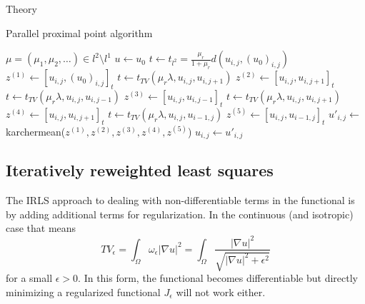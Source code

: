 \begin{chapter}{Theory}
\begin{algorithm}
\caption{Parallel proximal point algorithm}
\label{al:parallel_prpt}
\begin{algorithmic}
\REQUIRE $\mu =(\mu_1,\mu_2, \ldots)\in l^2\setminus l^1$
\STATE $u \leftarrow u_0$
\STATE $t \leftarrow t_{l^{2}}=\frac{\mu_r}{1+\mu_r}d(u_{i,j},(u_0)_{i,j})$
\STATE $z^{(1)} \leftarrow [u_{i,j},(u_0)_{i,j}]_t$
\STATE $t \leftarrow  t_{TV}(\mu_r\lambda,u_{i,j},u_{i,j+1})$
\STATE $z^{(2)} \leftarrow [u_{i,j},u_{i,j+1}]_t$
\STATE $t \leftarrow  t_{TV}(\mu_r\lambda,u_{i,j},u_{i,j-1})$
\STATE $z^{(3)} \leftarrow [u_{i,j},u_{i,j-1}]_t$
\STATE $t \leftarrow  t_{TV}(\mu_r\lambda,u_{i,j},u_{i,j+1})$
\STATE $z^{(4)} \leftarrow [u_{i,j},u_{i,j+1}]_t$
\STATE $t \leftarrow  t_{TV}(\mu_r\lambda,u_{i,j},u_{i-1,j})$
\STATE $z^{(5)} \leftarrow [u_{i,j},u_{i-1,j}]_t$
\STATE $u'_{i,j} \leftarrow$ karchermean($z^{(1)},z^{(2)},z^{(3)},z^{(4)},z^{(5)}$)
\ENDFOR
{}
\STATE $u_{i,j} \leftarrow u'_{i,j}$
\ENDFOR
\ENDFOR
\end{algorithmic}
\end{algorithm}



\subsection{Iteratively reweighted least squares} %
\label{sub:IRLS}
The IRLS approach to dealing with non-differentiable terms in the functional is by adding additional terms for regularization. In the continuous (and isotropic) case that means
\begin{equation}
    \label{eq:regulzarized_tv}
    TV_{\epsilon}=\int_{\Omega}\omega_{\epsilon}|\nabla u|^2 =\int_{\Omega}\frac{|\nabla u|^2}{\sqrt{|\nabla u|^2+\epsilon^2}}
\end{equation}
for a small $\epsilon>0$. In this form, the functional becomes differentiable but directly minimizing a
regularized functional $J_{\epsilon}$ will not work either.\\


\end{chapter}
